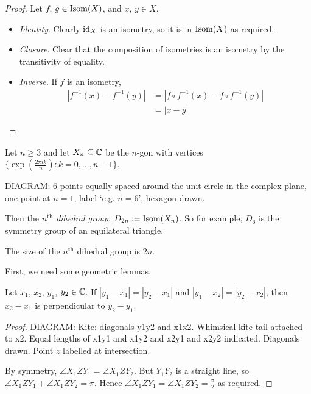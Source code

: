 \documentclass{../../template/note}
\begin{document}
    \begin{proof}
        Let \(f\), \(g \in \operatorname{Isom}(X)\), and \(x\), \(y \in X\).
        \begin{itemize}
            \item \emph{Identity}. Clearly \(\operatorname{id}_X\) is an isometry, so it is in \(\operatorname{Isom}(X)\) as required.
            \item \emph{Closure}. Clear that the composition of isometries is an isometry by the transitivity of equality.
            \item \emph{Inverse}. If \(f\) is an isometry,
            \begin{align*}
                |f^{-1}(x) - f^{-1}(y)| &= |f \circ f^{-1}(x) - f \circ f^{-1}(y)| \\
                &= |x - y|
            \end{align*}
        \end{itemize}
    \end{proof}
    
    \begin{definition}
        Let \(n \geq 3\) and let \(X_n \subseteq \mathbb C\) be the \(n\)-gon with vertices \(\{\exp(\frac{2 \pi i k}{n}) : k = 0, \dots, n-1\}\).

        DIAGRAM: \(6\) points equally spaced around the unit circle in the complex plane, one point at \(n=1\), label `e.g. \(n=6\)', hexagon drawn.

        Then the \emph{\(n^\text{th}\) dihedral group}, \(D_{2n} := \operatorname{Isom}(X_n)\). So for example, \(D_6\) is the symmetry group of an equilateral triangle.
    \end{definition}
    
    \begin{theorem}
        The size of the \(n^\text{th}\) dihedral group is \(2n\).
    \end{theorem}
    
    First, we need some geometric lemmas.

    \begin{lemma}
        Let \(x_1\), \(x_2\), \(y_1\), \(y_2 \in \mathbb C\). If \(|y_1-x_1| = |y_2-x_1|\) and \(|y_1-x_2| = |y_2-x_2|\), then \(x_2-x_1\) is perpendicular to \(y_2-y_1\).
    \end{lemma}
    
    \begin{proof}
        DIAGRAM: Kite: diagonals y1y2 and x1x2. Whimsical kite tail attached to x2. Equal lengths of x1y1 and x1y2 and x2y1 and x2y2 indicated. Diagonals drawn. Point \(z\) labelled at intersection.

        By symmetry, \(\angle X_1 Z Y_1 = \angle X_1 Z Y_2\). But \(Y_1Y_2\) is a straight line, so \(\angle X_1 Z Y_1 + \angle X_1 Z Y_2 = \pi\). Hence \(\angle X_1 Z Y_1 = \angle X_1 Z Y_2 = \frac \pi 2\) as required.
    \end{proof}
    
\end{document}
